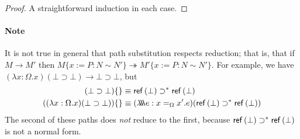 \begin{proof}
A straightforward induction in each case.
\end{proof}

\paragraph{Note}
It is not true in general that path substitution respects reduction; that is, that if $M \rightarrow M'$ then $M \{ x:=P : N \sim N' \} \twoheadrightarrow M' \{ x:=P : N \sim N' \}$.  For example, we have
$(\lambda x:\Omega.x)(\bot \supset \bot) \rightarrow \bot \supset \bot$,
but
\begin{align*}
(\bot \supset \bot) \{ \} & \equiv \mathsf{ref} \left( {\bot} \right) \supset^* \mathsf{ref} \left( {\bot} \right) \\
((\lambda x:\Omega.x)(\bot \supset \bot)) \{ \} & \equiv (\lambda \!\! \lambda \!\! \lambda e:x =_\Omega x'.e)(\mathsf{ref} \left( {\bot} \right) \supset^* \mathsf{ref} \left( {\bot} \right))
\end{align*}
The second of these paths does \emph{not} reduce to the first, because $\mathsf{ref} \left( {\bot} \right) \supset^* \mathsf{ref} \left( {\bot} \right)$ is not a normal form.

